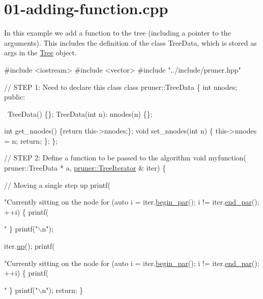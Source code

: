 \hypertarget{01-adding-function_8cpp-example}{}\section{01-\/adding-\/function.\+cpp}
In this example we add a function to the tree (including a pointer to the arguments). This includes the definition of the class Tree\+Data, which is stored as args in the \hyperlink{classTree}{Tree} object.


\begin{DoxyCodeInclude}
\textcolor{preprocessor}{#include <iostream>}
\textcolor{preprocessor}{#include <vector>}
\textcolor{preprocessor}{#include "../include/pruner.hpp"}

\textcolor{comment}{// STEP 1: Need to declare this class}
\textcolor{keyword}{class }pruner::TreeData \{
  \textcolor{keywordtype}{int} nnodes;
\textcolor{keyword}{public}:
  
  ~TreeData() \{\};
  TreeData(\textcolor{keywordtype}{int} n): nnodes(n) \{\};
  
  \textcolor{keywordtype}{int} get\_nnodes() \{\textcolor{keywordflow}{return} this->nnodes;\};
  \textcolor{keywordtype}{void} set\_nnodes(\textcolor{keywordtype}{int} n) \{
    this->nnodes = n;
    \textcolor{keywordflow}{return};
  \};
\};

\textcolor{comment}{// STEP 2: Define a function to be passed to the algorithm}
\textcolor{keywordtype}{void} myfunction(
    pruner::TreeData * a,
    \hyperlink{classpruner_1_1TreeIterator}{pruner::TreeIterator} & iter) \{
  
  \textcolor{comment}{// Moving a single step up}
  printf(\textcolor{stringliteral}{"Currently sitting on the node %
  \textcolor{keywordflow}{for} (\textcolor{keyword}{auto} i = iter.\hyperlink{classpruner_1_1TreeIterator_ac401c51b2a8b33e7db63b850350c21ce}{begin\_par}(); i != iter.\hyperlink{classpruner_1_1TreeIterator_a89ccb546a2fc6add499ac54ecb5271f8}{end\_par}(); ++i) \{
    printf(\textcolor{stringliteral}{" %
  \}
  printf(\textcolor{stringliteral}{"\(\backslash\)n"});
  
  iter.\hyperlink{classpruner_1_1TreeIterator_adca1d999f093a69e2f5d044b358e5da7}{up}();
  printf(\textcolor{stringliteral}{"Currently sitting on the node %
  \textcolor{keywordflow}{for} (\textcolor{keyword}{auto} i = iter.\hyperlink{classpruner_1_1TreeIterator_ac401c51b2a8b33e7db63b850350c21ce}{begin\_par}(); i != iter.\hyperlink{classpruner_1_1TreeIterator_a89ccb546a2fc6add499ac54ecb5271f8}{end\_par}(); ++i) \{
    printf(\textcolor{stringliteral}{" %
  \}
  printf(\textcolor{stringliteral}{"\(\backslash\)n"});
  \textcolor{keywordflow}{return};
\}

}}}}
\end{DoxyCodeInclude}
